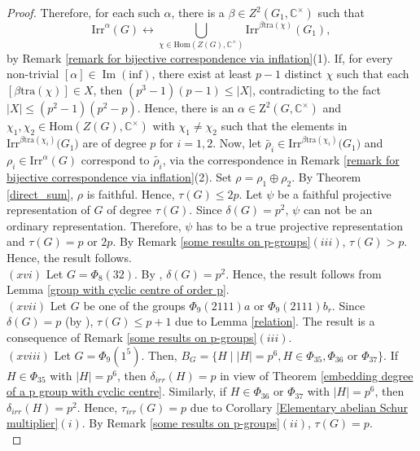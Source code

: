 \documentclass[a4paper,11pt]{amsart}
\numberwithin{equation}{section}
\numberwithin{equation}{subsection}
\newcommand{\C}{\mathbb{C}}
\begin{document}
\begin{proof}
Therefore, for each such $\alpha$, there is a $\beta \in Z^2(G_1, \mathbb{C}^{\times})$ such that $$\mathrm{Irr}^{\alpha}(G) \longleftrightarrow \bigcup_{\chi \in \mathrm{Hom}(Z(G),\C^{\times})} \mathrm{Irr}^{\beta\mathrm{tra}(\chi)}(G_1),$$ by Remark \ref{remark for bijective correspondence via inflation}(1).
If, for every non-trivial $[\alpha] \in \operatorname{Im} \operatorname{(inf)}$, there exist at least $p-1$ distinct $\chi$ such that each $[\beta \mathrm{tra}(\chi)]\in X$, then $(p^3-1)(p-1)\leq |X|$, contradicting to the fact $|X| \leq (p^2-1)(p^2-p)$. 
Hence, there is an $\alpha \in \mathrm{Z}^2(G, \C^{\times})$ and $\chi_1, \chi_2 \in \mathrm{Hom}(Z(G), \mathbb{C}^{\times})$ with $\chi_1 \neq \chi_2$ such that
the elements in $\mathrm{Irr}^{\beta \mathrm{tra}(\chi_i)}\big(G_1\big)$ are of degree $p$ for  $i=1,2$.
Now, let $\tilde{\rho_i} \in \mathrm{Irr}^{\beta \mathrm{tra}(\chi_i)}\big(G_1\big)$ and $\rho_i\in \mathrm{Irr}^{\alpha}(G)$ correspond to $\tilde{\rho_i}$, via the correspondence in Remark \ref{remark for bijective correspondence via inflation}(2). Set $\rho= \rho_1 \oplus \rho_2$. By Theorem \ref{direct_sum}, $\rho$ is faithful. Hence, $\tau(G) \leq 2p$.  
Let $\psi$ be a faithful projective representation of $G$ of degree $\tau(G)$. Since $\delta(G) =p^2$, $\psi$ can not be an ordinary representation. Therefore, $\psi$ has to be a true projective representation and $\tau(G)= p$ or $2p$. By Remark \ref{some results on p-groups}$(iii)$, $\tau(G)> p$. Hence, the result follows. \\ 

$(xvi)$ Let $G = \Phi_8(32)$. By \cite[Theorem 3.1(4)(vi)]{kaur}, $\delta(G)= p^2$. Hence, the result follows from Lemma \ref{group with cyclic centre of order p}. \\

$(xvii)$ Let $G$ be one of the groups $\Phi_{9}(2111)a$ or $\Phi_{9}(2111)b_r$. Since $\delta(G)= p$ (by \cite[Theorem 3.1(4)(vii)]{kaur}), $\tau(G) \leq p+1$ due to Lemma \ref{relation}. The result is a consequence of Remark \ref{some results on p-groups}$(iii)$. \\

$(xviii)$ Let $G= \Phi_{9}(1^{5})$. Then, $B_{G}=\{H \mid |H|= p^6, H \in \Phi_{35}, \Phi_{36} \text{ or } \Phi_{37}\}$. If $H \in \Phi_{35}$ with $|H|= p^6$, then $\delta_{irr}(H)= p$ in view of Theorem \ref{embedding degree of a p group with cyclic centre}. Similarly, if $H \in \Phi_{36}$ or $\Phi_{37}$ with $|H|= p^6$, then $\delta_{irr}(H)= p^2$. Hence, $\tau_{irr}(G)= p$ due to Corollary \ref{Elementary abelian Schur multiplier}$(i)$. By Remark \ref{some results on p-groups}$(ii)$, $\tau(G)= p$. \\


\end{proof}
\end{document}
